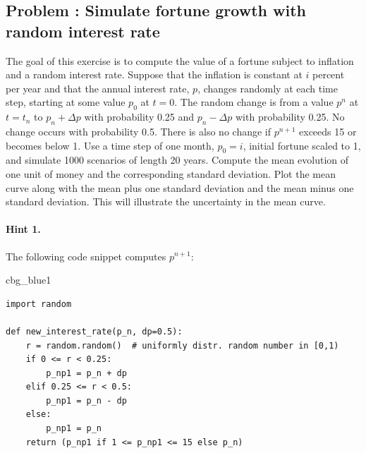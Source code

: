 \documentclass[%
oneside,                 %
final,                   %
10pt]{article}
\newenvironment{_cod_tight}[1]{
   \def\FrameCommand{\colorbox{#1}}
   \FrameRule0.6pt\MakeFramed {\FrameRestore}\vskip3mm}
   {\vskip0mm\endMakeFramed}
\newenvironment{cod}[1]{
\bgroup\rmfamily
\fboxsep=0mm\relax
\begin{_cod_tight}{#1}
\list{}{\parsep=-2mm\parskip=0mm\topsep=0pt\leftmargin=2mm
\rightmargin=2\leftmargin\leftmargin=4pt\relax}
\item\relax}
{\endlist\end{_cod_tight}\egroup}
\newenvironment{doconceexercise}{}{}
\newcounter{doconceexercisecounter}
\begin{document}
\begin{doconceexercise}

\subsection*{Problem \thedoconceexercisecounter: Simulate fortune growth with random interest rate}

\label{decay:app:exer:interest}

The goal of this exercise is to compute the value of a fortune subject
to inflation and a random interest rate.
Suppose that the inflation is constant at $i$ percent per year and that the
annual interest rate, $p$, changes randomly at each time step,
starting at some value $p_0$ at $t=0$.
The random change is from a value $p^n$ at $t=t_n$ to
$p_n +\Delta p$ with probability 0.25 and $p_n -\Delta p$ with probability 0.25.
No change occurs with probability 0.5. There is also no change if
$p^{n+1}$ exceeds 15 or becomes below 1.
Use a time step of one month, $p_0=i$, initial fortune scaled to 1,
and simulate 1000 scenarios of
length 20 years. Compute the mean evolution of one unit of money and the
corresponding
standard deviation. Plot the mean curve along with the mean plus one
standard deviation and the mean minus one standard deviation. This will
illustrate the uncertainty in the mean curve.


\paragraph{Hint 1.}
The following code snippet computes $p^{n+1}$:
\begin{cod}{cbg_blue1}\begin{Verbatim}[numbers=none,fontsize=\fontsize{9pt}{9pt},baselinestretch=0.95,xleftmargin=2mm]
import random

def new_interest_rate(p_n, dp=0.5):
    r = random.random()  # uniformly distr. random number in [0,1)
    if 0 <= r < 0.25:
        p_np1 = p_n + dp
    elif 0.25 <= r < 0.5:
        p_np1 = p_n - dp
    else:
        p_np1 = p_n
    return (p_np1 if 1 <= p_np1 <= 15 else p_n)
\end{Verbatim}
\end{cod}
\noindent




\end{doconceexercise}
\end{document}
